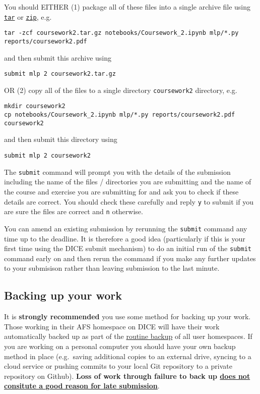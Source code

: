 \documentclass[11pt,]{article}
\begin{document}
You should EITHER (1) package all of these files into a single archive
file using
\href{http://linuxcommand.org/man_pages/tar1.html}{\texttt{tar}} or
\href{http://linuxcommand.org/man_pages/zip1.html}{\texttt{zip}}, e.g.

{\small
\begin{verbatim}
tar -zcf coursework2.tar.gz notebooks/Coursework_2.ipynb mlp/*.py reports/coursework2.pdf
\end{verbatim}
}

and then submit this archive using

\begin{verbatim}
submit mlp 2 coursework2.tar.gz
\end{verbatim}

OR (2) copy all of the files to a single directory \texttt{coursework2}
directory, e.g.

\begin{verbatim}
mkdir coursework2
cp notebooks/Coursework_2.ipynb mlp/*.py reports/coursework2.pdf coursework2
\end{verbatim}

and then submit this directory using

\begin{verbatim}
submit mlp 2 coursework2
\end{verbatim}

The \texttt{submit} command will prompt you with the details of the
submission including the name of the files / directories you are
submitting and the name of the course and exercise you are submitting
for and ask you to check if these details are correct. You should check
these carefully and reply \texttt{y} to submit if you are sure the files
are correct and \texttt{n} otherwise.

You can amend an existing submission by rerunning the \texttt{submit}
command any time up to the deadline. It is therefore a good idea
(particularly if this is your first time using the DICE submit
mechanism) to do an initial run of the \texttt{submit} command early on
and then rerun the command if you make any further updates to your
submisison rather than leaving submission to the last minute.

\subsection{Backing up your work}\label{backing-up-your-work}

It is \textbf{strongly recommended} you use some method for backing up
your work. Those working in their AFS homespace on DICE will have their
work automatically backed up as part of the
\href{http://computing.help.inf.ed.ac.uk/backups-and-mirrors}{routine
backup} of all user homespaces. If you are working on a personal
computer you should have your own backup method in place (e.g.~saving
additional copies to an external drive, syncing to a cloud service or
pushing commits to your local Git repository to a private repository on
Github). \textbf{Loss of work through failure to back up
\href{http://tinyurl.com/edinflate}{does not consitute a good reason for
late submission}}.
\end{document}
